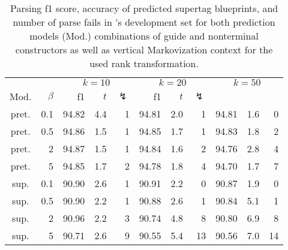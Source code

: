 \documentclass[../../document.tex]{subfiles}
\begin{document}
    \begin{table}
        \caption{\label{tbl:experiments:dptb:k}
        Parsing f1 score, accuracy of predicted  supertag blueprints, and number of parse fails in \tiger{}'s development set for both prediction models (Mod.) combinations of guide and nonterminal constructors as well as vertical Markovization context for the used rank transformation.
        }
        \centering
        \setlength{\tabcolsep}{4pt}
        \vspace{.2cm}
        \begin{tabular}{cr|rrr|rrr|rrr}
            \toprule
&     &       \multicolumn{3}{c|}{$k = 10$} & \multicolumn{3}{c|}{$k = 20$} & \multicolumn{3}{c}{$k = 50$} \\
Mod. &  $\beta$  & f1 & $t$ & $\lightning$ & f1 & $t$ & $\lightning$ \\ \hline
pret. & 0.1  & 94.82 & 4.4 & 1 & 94.81 & 2.0 & 1 & 94.81 & 1.6 & 0 \\
pret. & 0.5  & 94.86 & 1.5 & 1 & 94.85 & 1.7 & 1 & 94.83 & 1.8 & 2 \\
pret. &   2  & 94.87 & 1.5 & 1 & 94.84 & 1.6 & 2 & 94.76 & 2.8 & 4 \\
pret. &   5  & 94.85 & 1.7 & 2 & 94.78 & 1.8 & 4 & 94.70 & 1.7 & 7 \\
\midrule 
sup. & 0.1  & 90.90 & 2.6 & 1 & 90.91 & 2.2 &  0 & 90.87 & 1.9 &  0 \\
sup. & 0.5  & 90.90 & 2.2 & 1 & 90.88 & 2.6 &  1 & 90.84 & 5.1 &  1 \\
sup. &   2  & 90.96 & 2.2 & 3 & 90.74 & 4.8 &  8 & 90.80 & 6.9 &  8 \\
sup. &   5  & 90.71 & 2.6 & 9 & 90.55 & 5.4 & 13 & 90.56 & 7.0 & 14 \\
    \bottomrule
        \end{tabular}
    \end{table}
\end{document}
